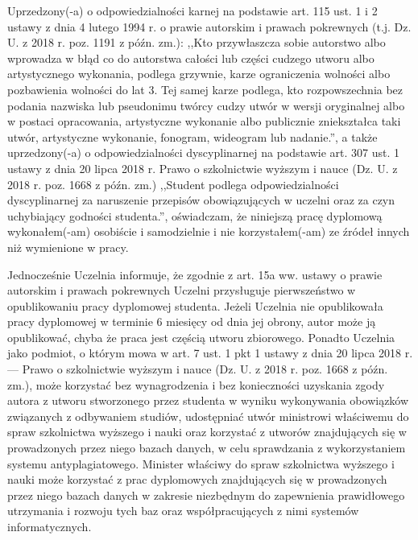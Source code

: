 \documentclass[a4paper,12pt]{article}
\begin{document}
{\sf Uprzedzony(-a) o odpowiedzialności karnej na podstawie art. 115 ust. 1 i 2 ustawy z dnia 4 lutego 1994 r. o prawie autorskim i prawach pokrewnych (t.j. Dz. U. z 2018 r. poz. 1191 z późn. zm.): ,,Kto przywłaszcza sobie autorstwo albo wprowadza w błąd co do autorstwa całości lub części cudzego utworu albo artystycznego wykonania, podlega grzywnie, karze ograniczenia wolności albo pozbawienia wolności do lat 3. Tej samej karze podlega, kto rozpowszechnia bez podania nazwiska lub pseudonimu twórcy cudzy utwór w wersji oryginalnej albo w postaci opracowania, artystyczne wykonanie albo publicznie zniekształca taki utwór, artystyczne wykonanie, fonogram, wideogram lub nadanie.'', a także uprzedzony(-a) o odpowiedzialności dyscyplinarnej na podstawie art. 307 ust. 1 ustawy z dnia 20 lipca 2018 r. Prawo o szkolnictwie wyższym i nauce (Dz. U. z 2018 r. poz. 1668 z późn. zm.) ,,Student podlega odpowiedzialności dyscyplinarnej za naruszenie przepisów obowiązujących w uczelni oraz za czyn uchybiający godności studenta.'', oświadczam, że niniejszą pracę dyplomową wykonałem(-am) osobiście i samodzielnie i nie korzystałem(-am) ze źródeł innych niż wymienione w pracy.

\bigskip

Jednocześnie Uczelnia informuje, że zgodnie z art. 15a ww. ustawy o prawie autorskim i prawach pokrewnych Uczelni przysługuje pierwszeństwo w opublikowaniu pracy dyplomowej studenta. Jeżeli Uczelnia nie opublikowała pracy dyplomowej w terminie 6 miesięcy od dnia jej obrony, autor może ją opublikować, chyba że praca jest częścią utworu zbiorowego. Ponadto Uczelnia jako podmiot, o którym mowa w art. 7 ust. 1 pkt 1 ustawy z dnia 20 lipca 2018 r. --- Prawo o szkolnictwie wyższym i nauce (Dz. U. z 2018 r. poz. 1668 z późn. zm.), może korzystać bez wynagrodzenia i bez konieczności uzyskania zgody autora z utworu stworzonego przez studenta w wyniku wykonywania obowiązków związanych z odbywaniem studiów, udostępniać utwór ministrowi właściwemu do spraw szkolnictwa wyższego i nauki oraz korzystać z utworów znajdujących się w prowadzonych przez niego bazach danych, w celu sprawdzania z wykorzystaniem systemu antyplagiatowego. Minister właściwy do spraw szkolnictwa wyższego i nauki może korzystać z prac dyplomowych znajdujących się w prowadzonych przez niego bazach danych w zakresie niezbędnym do zapewnienia prawidłowego utrzymania i rozwoju tych baz oraz współpracujących z nimi systemów informatycznych.}

\vspace{14ex}
\end{document}
